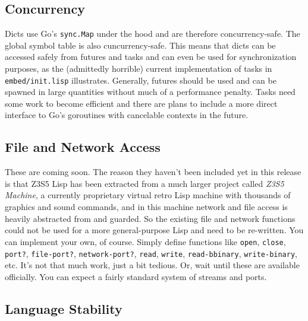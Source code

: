 \documentclass[
]{article}
\newcommand{\passthrough}[1]{#1}
\begin{document}
\hypertarget{concurrency}{%
\subsection{Concurrency}\label{concurrency}}

Dicts use Go's \passthrough{\lstinline!sync.Map!} under the hood and are
therefore concurrency-safe. The global symbol table is also
cuncurrency-safe. This means that dicts can be accessed safely from
futures and tasks and can even be used for synchronization purposes, as
the (admittedly horrible) current implementation of tasks in
\passthrough{\lstinline!embed/init.lisp!} illustrates. Generally,
futures should be used and can be spawned in large quantities without
much of a performance penalty. Tasks need some work to become efficient
and there are plans to include a more direct interface to Go's
goroutines with cancelable contexts in the future.

\hypertarget{file-and-network-access}{%
\subsection{File and Network Access}\label{file-and-network-access}}

These are coming soon. The reason they haven't been included yet in this
release is that Z3S5 Lisp has been extracted from a much larger project
called \emph{Z3S5 Machine}, a currently proprietary virtual retro Lisp
machine with thousands of graphics and sound commands, and in this
machine network and file access is heavily abstracted from and guarded.
So the existing file and network functions could not be used for a more
general-purpose Lisp and need to be re-written. You can implement your
own, of course. Simply define functions like
\passthrough{\lstinline!open!}, \passthrough{\lstinline!close!},
\passthrough{\lstinline!port?!}, \passthrough{\lstinline!file-port?!},
\passthrough{\lstinline!network-port?!}, \passthrough{\lstinline!read!},
\passthrough{\lstinline!write!}, \passthrough{\lstinline!read-bbinary!},
\passthrough{\lstinline!write-binary!}, etc. It's not that much work,
just a bit tedious. Or, wait until these are available officially. You
can expect a fairly standard system of streams and ports.

\hypertarget{language-stability}{%
\subsection{Language Stability}\label{language-stability}}
\end{document}
